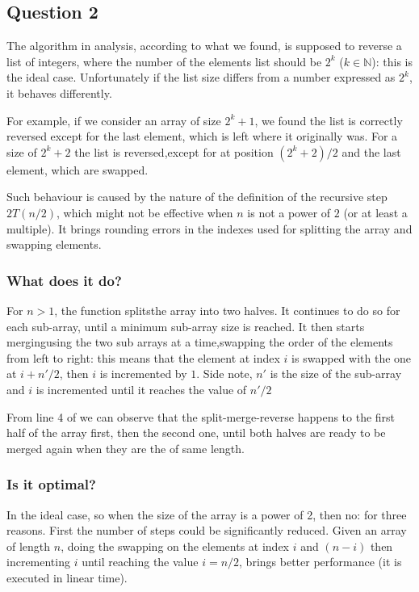 \documentclass[12pt]{article}
\begin{document}
\subsection*{Question 2}

The algorithm in analysis, according to what we found, is supposed to reverse a list of integers, where the number of the elements
list should be $2^k$ ($k \in \mathbb{N}$): this is the ideal case. Unfortunately if the list size differs from a number expressed as $2^k$, it behaves
differently. 

For example, if we consider an array of size $2^k + 1$, we found the list is correctly reversed except for the last element, which
is left where it originally was. For a size of $2^k + 2$ the list is reversed,except for at position $(2^k + 2)/2$ and the last element, which are swapped.

Such behaviour is caused by the nature of the definition of the recursive step $2T(n/2)$, which might not be effective 
when $n$ is not a power of $2$ (or at least a multiple). It brings rounding errors in the indexes used for splitting the array and swapping elements.

\subsubsection*{What does it do?}

For $n > 1$, the  function splits\footnotemark[1]   the array into two halves. It continues to do so for each sub-array, until a minimum sub-array size is reached. It then starts merging\footnotemark[1] using  the two sub arrays at a time,swapping the order of the elements from left to right: this means that the element at index $i$ is swapped with the one at $i + n'/2$, then $i$ is incremented by $1$. Side note, $n'$ is the size of the sub-array and $i$ is incremented until it reaches the value of $n'/2$

From line 4 of  we can observe that the split-merge-reverse happens to the first half of the array first, 
then the second one, until both halves are ready to be merged again when they are the of same length.  

\subsubsection*{Is it optimal?}

In the ideal case, so when the size of the array is a power of 2, then no: for three reasons. First the number of steps could 
be significantly reduced. Given an array of length $n$, doing the swapping on the elements at index $i$ and $(n-i)$ then incrementing $i$ until reaching the value $i = n/2$, brings better performance (it is executed in linear time). 
\end{document}
